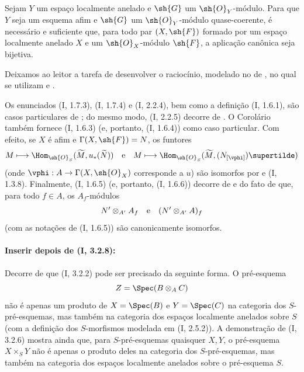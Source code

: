 \documentclass[oneside,10pt]{amsart}
\makeatletter
\newcommand{\ega@arrow}[2]{\mathchoice{#1}{#2}{#2}{#2}}
\renewcommand{\to}{\ega@arrow{\longrightarrow}{\rightarrow}}
\let\EGAOriginalLabel\label
\renewcommand{\label}[1]{\phantomsection\EGAOriginalLabel{#1}}
\makeatother
\begin{document}
\begin{corollary}[1.8.10]
\label{ega2:addendum:I.1.8.10}
Sejam $Y$ um espaço localmente anelado e $\sh{G}$ um
$\sh{O}_Y$-módulo. Para que $Y$ seja um esquema afim e $\sh{G}$ um
$\sh{O}_Y$-módulo quase-coerente, é necessário e suficiente que, para
todo par $(X,\sh{F})$ formado por um espaço localmente anelado $X$ e
um $\sh{O}_X$-módulo $\sh{F}$, a aplicação canônica
 seja bijetiva.
\end{corollary}

Deixamos ao leitor a tarefa de desenvolver o raciocínio, modelado no
de , no qual se utilizam  e
.

\begin{remark}[1.8.11]
\label{ega2:addendum:I.1.8.11}
Os enunciados (I, 1.7.3), (I, 1.7.4) e (I, 2.2.4), bem como a
definição (I, 1.6.1), são casos particulares de ; do
mesmo modo, (I, 2.2.5) decorre de . O
Corolário~ também fornece (I, 1.6.3) (e, portanto,
(I, 1.6.4)) como caso particular. Com efeito, se $X$ é afim e
$\Gamma(X,\sh{F})=N$, os funtores
\[
  M\longmapsto
  \Hom_{\sh{O}_S}(\widetilde M,u_*(\widetilde N))
  \quad\hbox{e}\quad
  M\longmapsto
  \Hom_{\sh{O}_S}(\widetilde M,(N_{[\vphi]})\supertilde)
\]
(onde $\vphi:A\to\Gamma(X,\sh{O}_X)$ corresponde a $u$) são
isomorfos por  e (I, 1.3.8). Finalmente, (I, 1.6.5) (e,
portanto, (I, 1.6.6)) decorre de  e do fato de que, para
todo $f\in A$, os $A_f$-módulos
\[
  N'\otimes_{A'}A_f
  \quad\hbox{e}\quad
  (N'\otimes_{A'}A)_f
\]
(com as notações de (I, 1.6.5)) são canonicamente isomorfos.
\end{remark}

\paragraph{Inserir depois de (I, 3.2.8):}

\begin{env}[3.2.9]
\label{ega2:addendum:I.3.2.9}
Decorre de  que (I, 3.2.2) pode ser precisado da seguinte
forma. O pré-esquema
\[
  Z=\Spec(B\otimes_A C)
\]
não é apenas um produto de $X=\Spec(B)$ e $Y=\Spec(C)$ na categoria
dos $S$-pré-esquemas, mas também na categoria dos espaços localmente
anelados sobre $S$ (com a definição dos $S$-morfismos modelada em
(I, 2.5.2)). A demonstração de (I, 3.2.6) mostra ainda que, para
$S$-pré-esquemas quaisquer $X,Y$, o pré-esquema $X\times_S Y$ não é
apenas o produto deles na categoria dos $S$-pré-esquemas, mas também
na categoria dos espaços localmente anelados sobre o pré-esquema $S$.
\end{env}
\end{document}
